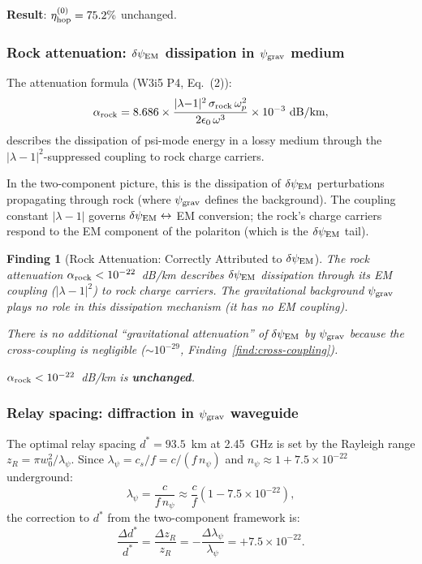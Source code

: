 \documentclass[11pt]{article}
\newtheorem{finding}{Finding}
\newcommand{\ee}[1]{\times 10^{#1}}
\newcommand{\psigrav}{\psi_{\rm grav}}
\newcommand{\dpsiEM}{\delta\psi_{\rm EM}}
\newcommand{\lambdaone}{|\lambda{-}1|}
\newcommand{\etahop}{\eta_{\rm hop}}
\newcommand{\alpharock}{\alpha_{\rm rock}}
\newcommand{\npsi}{n_\psi}
\begin{document}
\textbf{Result}: $\etahop^{(0)} = 75.2\%$ unchanged.

\subsubsection{Rock attenuation: $\dpsiEM$ dissipation in $\psigrav$ medium}

The attenuation formula (W3i5 P4, Eq.~(2)):
\begin{equation}
\alpharock = 8.686 \times \frac{\lambdaone^2\,\sigma_{\rm rock}\,\omega_p^2}
{2\epsilon_0\,\omega^3} \times 10^{-3}~\text{dB/km},
\end{equation}
describes the dissipation of psi-mode energy in a lossy medium through
the $\lambdaone^2$-suppressed coupling to rock charge carriers.

In the two-component picture, this is the dissipation of $\dpsiEM$
perturbations propagating through rock (where $\psigrav$ defines the
background). The coupling constant $\lambdaone$ governs $\dpsiEM
\leftrightarrow$ EM conversion; the rock's charge carriers respond to
the EM component of the polariton (which is the $\dpsiEM$ tail).

\begin{finding}[Rock Attenuation: Correctly Attributed to $\dpsiEM$]
\label{find:alpha-rock-two-comp}
The rock attenuation $\alpharock < 10^{-22}$~dB/km describes $\dpsiEM$
dissipation through its EM coupling ($\lambdaone^2$) to rock charge
carriers. The gravitational background $\psigrav$ plays no role in this
dissipation mechanism (it has no EM coupling).

There is no additional ``gravitational attenuation'' of $\dpsiEM$ by
$\psigrav$ because the cross-coupling is negligible ($\sim 10^{-29}$,
Finding~\ref{find:cross-coupling}).

$\alpharock < 10^{-22}$~dB/km is \textbf{unchanged}.
\end{finding}

\subsubsection{Relay spacing: diffraction in $\psigrav$ waveguide}

The optimal relay spacing $d^* = 93.5$~km at 2.45~GHz is set by the
Rayleigh range $z_R = \pi w_0^2/\lambda_\psi$. Since $\lambda_\psi
= c_s/f = c/(f\,\npsi)$ and $\npsi \approx 1 + 7.5\ee{-22}$ underground:
\begin{equation}
\lambda_\psi = \frac{c}{f\,\npsi} \approx \frac{c}{f}(1 - 7.5\ee{-22}),
\end{equation}
the correction to $d^*$ from the two-component framework is:
\begin{equation}
\frac{\Delta d^*}{d^*} = \frac{\Delta z_R}{z_R}
= -\frac{\Delta\lambda_\psi}{\lambda_\psi} = +7.5\ee{-22}.
\end{equation}
\end{document}
